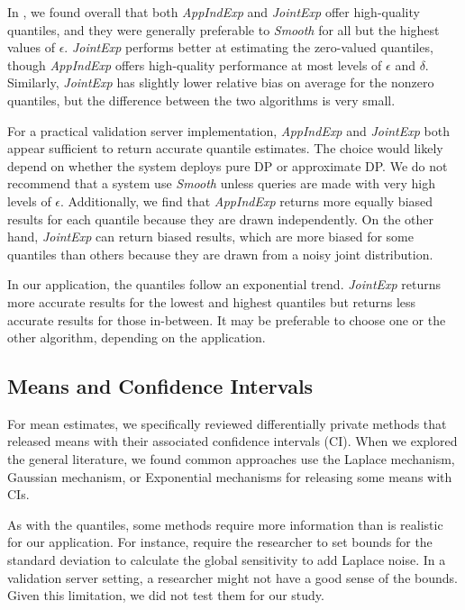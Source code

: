 In \citet{barrientos2021}, we found overall that both \textit{AppIndExp} and \textit{JointExp} offer high-quality quantiles, and they were generally preferable to \textit{Smooth} for all but the highest values of $\epsilon$. \textit{JointExp} performs better at estimating the zero-valued quantiles, though \textit{AppIndExp} offers high-quality performance at most levels of $\epsilon$ and $\delta$. Similarly, \textit{JointExp} has slightly lower relative bias on average for the nonzero quantiles, but the difference between the two algorithms is very small. 

For a practical validation server implementation, \textit{AppIndExp} and \textit{JointExp} both appear sufficient to return accurate quantile estimates. The choice would likely depend on whether the system deploys pure DP or approximate DP. We do not recommend that a system use \textit{Smooth} unless queries are made with very high levels of $\epsilon$. Additionally, we find that \textit{AppIndExp} returns more equally biased results for each quantile because they are drawn independently. On the other hand, \textit{JointExp} can return biased results, which are more biased for some quantiles than others because they are drawn from a noisy joint distribution.

In our application, the quantiles follow an exponential trend. \textit{JointExp} returns more accurate results for the lowest and highest quantiles but returns less accurate results for those in-between. It may be preferable to choose one or the other algorithm, depending on the application.

\subsection{Means and Confidence Intervals}
For mean estimates, we specifically reviewed differentially private methods that released means with their associated confidence intervals (CI). When we explored the general literature, we found common approaches use the Laplace mechanism, Gaussian mechanism, or Exponential mechanisms for releasing some means with CIs.

As with the quantiles, some methods require more information than is realistic for our application. For instance, \citet{karwa2017finite, bowen2020comparative, d2015differential, biswas2020coinpress} require the researcher to set bounds for the standard deviation to calculate the global sensitivity to add Laplace noise. In a validation server setting, a researcher might not have a good sense of the bounds. Given this limitation, we did not test them for our study.

